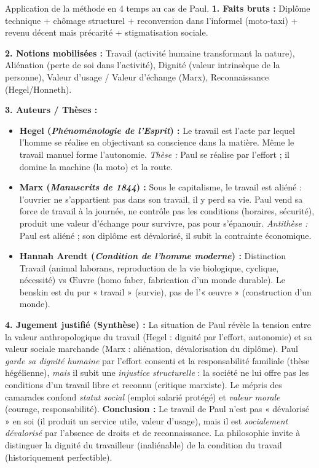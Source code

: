 \documentclass[11pt]{article}
\newcommand{\cle}[1]{{\popxbold\color{popdark}#1}}
\begin{document}
\begin{exoresolu}
Application de la méthode en 4 temps au cas de Paul.
\tcblower
\textbf{1. Faits bruts :} Diplôme technique + chômage structurel + reconversion dans l'informel (moto-taxi) + revenu décent mais précarité + stigmatisation sociale.

\textbf{2. Notions mobilisées :} \cle{Travail} (activité humaine transformant la nature), \cle{Aliénation} (perte de soi dans l'activité), \cle{Dignité} (valeur intrinsèque de la personne), \cle{Valeur d'usage / Valeur d'échange} (Marx), \cle{Reconnaissance} (Hegel/Honneth).

\textbf{3. Auteurs / Thèses :}
\begin{itemize}
    \item \textbf{Hegel (\emph{Phénoménologie de l'Esprit}) :} Le travail est l'acte par lequel l'homme se \cle{réalise} en objectivant sa conscience dans la matière. Même le travail manuel forme l'autonomie. \emph{Thèse :} Paul se réalise par l'effort ; il domine la machine (la moto) et la route.
    \item \textbf{Marx (\emph{Manuscrits de 1844}) :} Sous le capitalisme, le travail est \cle{aliéné} : l'ouvrier ne s'appartient pas dans son travail, il y perd sa vie. Paul vend sa force de travail à la journée, ne contrôle pas les conditions (horaires, sécurité), produit une valeur d'échange pour survivre, pas pour s'épanouir. \emph{Antithèse :} Paul est aliéné ; son diplôme est dévalorisé, il subit la contrainte économique.
    \item \textbf{Hannah Arendt (\emph{Condition de l'homme moderne}) :} Distinction \cle{Travail} (animal laborans, reproduction de la vie biologique, cyclique, nécessité) vs \cle{Œuvre} (homo faber, fabrication d'un monde durable). Le benskin est du pur « travail » (survie), pas de l'« œuvre » (construction d'un monde).
\end{itemize}

\textbf{4. Jugement justifié (Synthèse) :}
La situation de Paul révèle la \cle{tension entre la valeur anthropologique du travail (Hegel : dignité par l'effort, autonomie) et sa valeur sociale marchande (Marx : aliénation, dévalorisation du diplôme)}. Paul \emph{garde sa dignité humaine} par l'effort consenti et la responsabilité familiale (thèse hégélienne), \emph{mais} il subit une \emph{injustice structurelle} : la société ne lui offre pas les conditions d'un travail libre et reconnu (critique marxiste). Le mépris des camarades confond \emph{statut social} (emploi salarié protégé) et \emph{valeur morale} (courage, responsabilité). \textbf{Conclusion :} Le travail de Paul n'est pas « dévalorisé » en soi (il produit un service utile, valeur d'usage), mais il est \emph{socialement dévalorisé} par l'absence de droits et de reconnaissance. La philosophie invite à distinguer la \cle{dignité du travailleur} (inaliénable) de la \cle{condition du travail} (historiquement perfectible).
\end{exoresolu}
\end{document}

